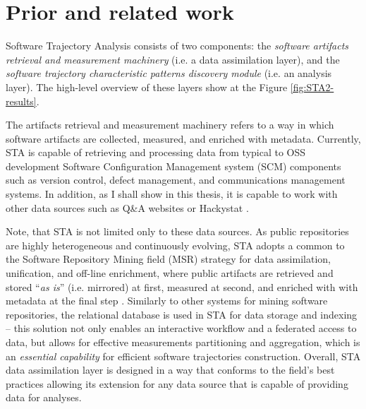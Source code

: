 \chapter{Prior and related work}\label{chapter_background_work}
Software Trajectory Analysis consists of two components: 
the \textit{software artifacts retrieval and measurement machinery} (i.e. a data assimilation layer), 
and the \textit{software trajectory characteristic patterns discovery module} (i.e. an analysis layer). 
The high-level overview of these layers show at the Figure \ref{fig:STA2-results}.

The artifacts retrieval and measurement machinery refers to a way in which software artifacts are 
collected, measured, and enriched with metadata. 
Currently, STA is capable of retrieving and processing data from typical to OSS development 
Software Configuration Management system (SCM) components such as version control, 
defect management, and communications management systems. 
In addition, as I shall show in this thesis, it is capable to work with other data sources such as Q\&A 
websites or Hackystat \cite{csdl2-10-09}.

Note, that STA is not limited only to these data sources.
As public repositories are highly heterogeneous and continuously evolving, STA adopts a common to the 
Software Repository Mining field (MSR) strategy for data assimilation, unification, and off-line enrichment,
where public artifacts are retrieved and stored ``\textit{as is}'' (i.e. mirrored) at first, 
measured at second, and enriched with with metadata at the final step 
\cite{citeulike:12550438} \cite{german04_softchange} \cite{cvsanaly}.
Similarly to other systems for mining software repositories, the relational database is used in STA 
for data storage and indexing -- this solution not only enables an interactive workflow and a federated access to 
data, but allows for effective measurements partitioning and aggregation, which is 
an \textit{essential capability} for efficient software trajectories construction.
Overall, STA data assimilation layer is designed in a way that conforms to the field's best practices
allowing its extension for any data source that is capable of providing data for analyses.

